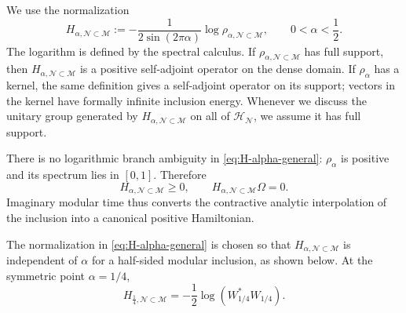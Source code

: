 \documentclass[a4paper,11pt]{article}
\theoremstyle{definition}
\newcommand{\mN}{\mathcal{N}}
\newcommand{\mH}{\mathcal{H}}
\newcommand{\mM}{\mathcal{M}}
\begin{document}
We use the normalization
\begin{equation}
    \boxed{
    H_{\alpha,\mN\subset\mM}
    :=
    -\frac{1}{2\sin(2\pi\alpha)}
    \log
    \rho_{\alpha,\mN\subset\mM},
    \qquad
    0<\alpha<\frac12 .
    }
    \label{eq:H-alpha-general}
\end{equation}
The logarithm is defined by the spectral calculus. If
$\rho_{\alpha,\mN\subset\mM}$ has full support, then
$H_{\alpha,\mN\subset\mM}$ is a positive self-adjoint operator on the dense
domain. If $\rho_\alpha$ has a kernel, the same definition gives a self-adjoint
operator on its support; vectors in the kernel have formally infinite
inclusion energy. Whenever we discuss the unitary group generated by
$H_{\alpha,\mN\subset\mM}$ on all of $\mH_{\mN}$, we assume it has full support. 

There is no logarithmic branch ambiguity in
\eqref{eq:H-alpha-general}: $\rho_\alpha$ is positive and its spectrum lies
in $[0,1]$. Therefore
\begin{equation}
    \boxed{
    H_{\alpha,\mN\subset\mM}\geq0,
    \qquad
    H_{\alpha,\mN\subset\mM}\Omega=0.
    }
    \label{eq:H-alpha-positive}
\end{equation}
Imaginary modular time thus converts the contractive analytic interpolation
of the inclusion into a canonical positive Hamiltonian.

The normalization in \eqref{eq:H-alpha-general} is chosen so that
$H_{\alpha,\mN\subset\mM}$ is independent of $\alpha$ for a half-sided
modular inclusion, as shown below. At the symmetric point $\alpha=1/4$,
\begin{equation}
    H_{\frac14,\mN\subset\mM}
    =
    -\frac12
    \log\left(W_{1/4}^*W_{1/4}\right).
    \label{eq:H-quarter}
\end{equation}
\end{document}
